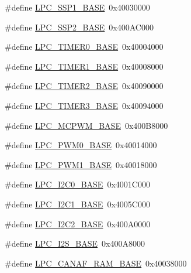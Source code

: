 \begin{DoxyCompactItemize}
\item 
\#define \hyperlink{group__PERIPH__177X__8X__BASE_ga05d118997f53f596d3a087f8b91a1969}{L\-P\-C\-\_\-\-S\-S\-P1\-\_\-\-B\-A\-S\-E}~0x40030000
\item 
\#define \hyperlink{group__PERIPH__177X__8X__BASE_ga1460d4b0a86fa00b3d3ef8abd21abbc1}{L\-P\-C\-\_\-\-S\-S\-P2\-\_\-\-B\-A\-S\-E}~0x400\-A\-C000
\item 
\#define \hyperlink{group__PERIPH__177X__8X__BASE_ga58d2cc2a6a4bd9319853ad5b62a20d43}{L\-P\-C\-\_\-\-T\-I\-M\-E\-R0\-\_\-\-B\-A\-S\-E}~0x40004000
\item 
\#define \hyperlink{group__PERIPH__177X__8X__BASE_ga077e94a95d95d79f6aeb0ea962377c46}{L\-P\-C\-\_\-\-T\-I\-M\-E\-R1\-\_\-\-B\-A\-S\-E}~0x40008000
\item 
\#define \hyperlink{group__PERIPH__177X__8X__BASE_gab46122134a159b494e060ae3a7be0967}{L\-P\-C\-\_\-\-T\-I\-M\-E\-R2\-\_\-\-B\-A\-S\-E}~0x40090000
\item 
\#define \hyperlink{group__PERIPH__177X__8X__BASE_ga002e95d51eef32473052ea2575440eac}{L\-P\-C\-\_\-\-T\-I\-M\-E\-R3\-\_\-\-B\-A\-S\-E}~0x40094000
\item 
\#define \hyperlink{group__PERIPH__177X__8X__BASE_gad8a41dc802e3ea0ba9457d42a6927c03}{L\-P\-C\-\_\-\-M\-C\-P\-W\-M\-\_\-\-B\-A\-S\-E}~0x400\-B8000
\item 
\#define \hyperlink{group__PERIPH__177X__8X__BASE_gad2e9bbd8d91b559eed11b8e83bd73bbf}{L\-P\-C\-\_\-\-P\-W\-M0\-\_\-\-B\-A\-S\-E}~0x40014000
\item 
\#define \hyperlink{group__PERIPH__177X__8X__BASE_gabb885bd92b4a003b94dc27c4700818bb}{L\-P\-C\-\_\-\-P\-W\-M1\-\_\-\-B\-A\-S\-E}~0x40018000
\item 
\#define \hyperlink{group__PERIPH__177X__8X__BASE_gab4476c9e874621194369f74fcf26ce92}{L\-P\-C\-\_\-\-I2\-C0\-\_\-\-B\-A\-S\-E}~0x4001\-C000
\item 
\#define \hyperlink{group__PERIPH__177X__8X__BASE_gae59f73cf24ff126be3b9a8b921926676}{L\-P\-C\-\_\-\-I2\-C1\-\_\-\-B\-A\-S\-E}~0x4005\-C000
\item 
\#define \hyperlink{group__PERIPH__177X__8X__BASE_ga00796bd1f1fa200bbffcd9e7e8679eaa}{L\-P\-C\-\_\-\-I2\-C2\-\_\-\-B\-A\-S\-E}~0x400\-A0000
\item 
\#define \hyperlink{group__PERIPH__177X__8X__BASE_gacff8b54e3924910d381e6b8ba804050c}{L\-P\-C\-\_\-\-I2\-S\-\_\-\-B\-A\-S\-E}~0x400\-A8000
\item 
\#define \hyperlink{group__PERIPH__177X__8X__BASE_ga9d4f2bac61e26b32ad64d62f2be50e49}{L\-P\-C\-\_\-\-C\-A\-N\-A\-F\-\_\-\-R\-A\-M\-\_\-\-B\-A\-S\-E}~0x40038000

\end{DoxyCompactItemize}

